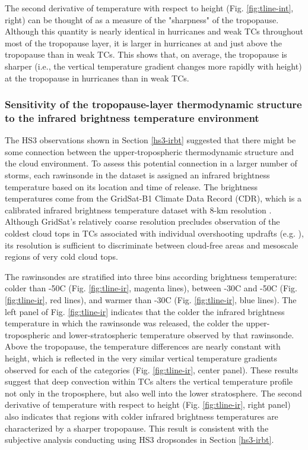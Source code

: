 The second derivative of temperature with respect to height (Fig. \ref{fig:tline-int}, right) can be thought of as a measure of the "sharpness" of the tropopause.
Although this quantity is nearly identical in hurricanes and weak TCs throughout most of the tropopause layer, it is larger in hurricanes at and just above the tropopause than in weak TCs.
This shows that, on average, the tropopause is sharper (i.e., the vertical temperature gradient changes more rapidly with height) at the tropopause in hurricanes than in weak TCs.

\subsubsection{Sensitivity of the tropopause-layer thermodynamic structure to the infrared brightness temperature environment}
The HS3 observations shown in Section \ref{hs3-irbt} suggested that there might be some connection between the upper-tropospheric thermodynamic structure and the cloud environment.
To assess this potential connection in a larger number of storms, each rawinsonde in the dataset is assigned an infrared brightness temperature based on its location and time of release.
The brightness temperatures come from the GridSat-B1 Climate Data Record (CDR), which is a calibrated infrared brightness temperature dataset with 8-km resolution \citep{Knappetal2011}.
Although GridSat's relatively coarse resolution precludes observation of the coldest cloud tops in TCs associated with individual overshooting updrafts (e.g. \citeauthor{Griffin2017} \citeyear{Griffin2017}), its resolution is sufficient to discriminate between cloud-free areas and mesoscale regions of very cold cloud tops.

The rawinsondes are stratified into three bins according brightness temperature: colder than -50\textdegree{}C (Fig. \ref{fig:tline-ir}, magenta lines), between -30\textdegree{}C and -50\textdegree{}C (Fig. \ref{fig:tline-ir}, red lines), and warmer than -30\textdegree{}C (Fig. \ref{fig:tline-ir}, blue lines).
The left panel of Fig. \ref{fig:tline-ir} indicates that the colder the infrared brightness temperature in which the rawinsonde was released, the colder the upper-tropospheric and lower-stratospheric temperature observed by that rawinsonde.
Above the tropopause, the temperature differences are nearly constant with height, which is reflected in the very similar vertical temperature gradients observed for each of the categories (Fig. \ref{fig:tline-ir}, center panel).
These results suggest that deep convection within TCs alters the vertical temperature profile not only in the troposphere, but also well into the lower stratosphere.
The second derivative of temperature with respect to height (Fig. \ref{fig:tline-ir}, right panel) also indicates that regions with colder infrared brightness temperatures are characterized by a sharper tropopause.
This result is consistent with the subjective analysis conducting using HS3 dropsondes in Section \ref{hs3-irbt}.

